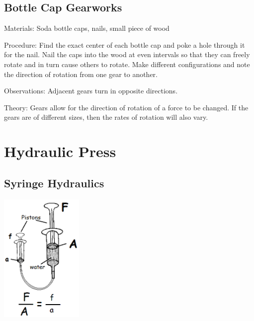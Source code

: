 \begin{multicols}{2}
\subsection{Bottle Cap Gearworks}


\begin{description*}
\item[Materials:]{Soda bottle caps, nails, small piece of wood}
\item[Procedure:]{Find the exact center of each bottle cap and poke a hole through it for the nail. Nail the caps into the wood at even intervals so that they can freely rotate and in turn cause others to rotate. Make different configurations and note the direction of rotation from one gear to another.}
\item[Observations:]{Adjacent gears turn in opposite directions.}
\item[Theory:]{Gears allow for the direction of rotation of a force to be changed. If the gears are of different sizes, then the rates of rotation will also vary.}
\end{description*}

\vfill
\columnbreak


\section*{Hydraulic Press}


\subsection{Syringe Hydraulics}

\begin{center}
\includegraphics[width=0.3\textwidth]{./img/source/hydraulic-press.png}
\end{center}


\end{multicols}
